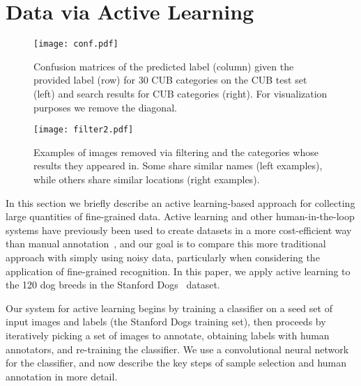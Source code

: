 \documentclass[runningheads]{llncs}
\begin{document}
\vspace{-2mm}
\section{Data via Active Learning}
\label{sec:active-learning}
\vspace{-2mm}


\begin{figure}[t]
\begin{minipage}[t]{0.48\linewidth}
\centering
\texttt{[image: conf.pdf]}
\caption{\label{fig:conf_mats}
Confusion matrices of the predicted label (column) given the provided label (row) for 30 CUB categories on the CUB test set (left) and search results for CUB categories (right).
For visualization purposes we remove the diagonal.
}
\end{minipage}
\hfill
\begin{minipage}[t]{0.48\linewidth}
\centering
\texttt{[image: filter2.pdf]}
\caption{\label{fig:filter_example}
Examples of images removed via filtering and the categories whose results they appeared in.
Some share similar names (left examples), while others share similar locations (right examples).
}
\end{minipage}
\end{figure}

In this section we briefly describe an active learning-based approach for collecting large quantities of fine-grained data.
Active learning and other human-in-the-loop systems have previously been used to create datasets in a more cost-efficient way than manual annotation~\cite{yu2015construction,collins2008towards,al-survey}, and our goal is to compare this more traditional approach with simply using noisy data, particularly when considering the application of fine-grained recognition.
In this paper, we apply active learning to the 120 dog breeds in the Stanford Dogs~\cite{khosla2011novel} dataset.

Our system for active learning begins by training a classifier on a seed set of input images and labels (\ie the Stanford Dogs training set), then proceeds by iteratively picking a set of images to annotate, obtaining labels with human annotators, and re-training the classifier.
We use a convolutional neural network~\cite{lecun1998gradient,szegedy2014going,ioffe2015batch} for the classifier, and now describe the key steps of sample selection and human annotation in more detail.
\end{document}
